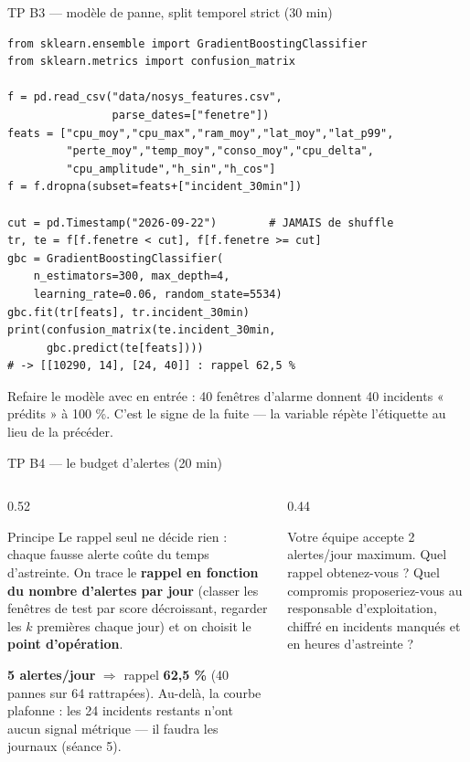 \begin{frame}[fragile]{TP B3 --- modèle de panne, split temporel strict (30 min)}
\footnotesize%
\begin{codebox}
\begin{lstlisting}
from sklearn.ensemble import GradientBoostingClassifier
from sklearn.metrics import confusion_matrix

f = pd.read_csv("data/nosys_features.csv",
                parse_dates=["fenetre"])
feats = ["cpu_moy","cpu_max","ram_moy","lat_moy","lat_p99",
         "perte_moy","temp_moy","conso_moy","cpu_delta",
         "cpu_amplitude","h_sin","h_cos"]
f = f.dropna(subset=feats+["incident_30min"])

cut = pd.Timestamp("2026-09-22")        # JAMAIS de shuffle
tr, te = f[f.fenetre < cut], f[f.fenetre >= cut]
gbc = GradientBoostingClassifier(
    n_estimators=300, max_depth=4,
    learning_rate=0.06, random_state=5534)
gbc.fit(tr[feats], tr.incident_30min)
print(confusion_matrix(te.incident_30min,
      gbc.predict(te[feats])))
# -> [[10290, 14], [24, 40]] : rappel 62,5 %
\end{lstlisting}
\end{codebox}
\begin{abox}
Refaire le modèle avec  en entrée : 40 fenêtres d'alarme
donnent 40 incidents « prédits » à 100 \%. C'est le signe de la fuite
--- la variable répète l'étiquette au lieu de la précéder.
\end{abox}
\end{frame}

\begin{frame}{TP B4 --- le budget d'alertes (20 min)}
\begin{columns}[t]
\begin{column}{0.52\textwidth}
\begin{block}{Principe}
Le rappel seul ne décide rien : chaque fausse alerte coûte du temps
d'astreinte. On trace le \textbf{rappel en fonction du nombre
d'alertes par jour} (classer les fenêtres de test par score
décroissant, regarder les $k$ premières chaque jour) et on choisit le
\textbf{point d'opération}.
\end{block}
\begin{solbox}
\textbf{5 alertes/jour} $\Rightarrow$ rappel \textbf{62,5 \%}
(40 pannes sur 64 rattrapées). Au-delà, la courbe plafonne : les
24 incidents restants n'ont aucun signal métrique --- il faudra les
journaux (séance 5).
\end{solbox}
\end{column}
\begin{column}{0.44\textwidth}
\begin{qbox}
Votre équipe accepte 2 alertes/jour maximum. Quel rappel obtenez-vous ?
Quel compromis proposeriez-vous au responsable d'exploitation, chiffré
en incidents manqués et en heures d'astreinte ?
\end{qbox}
\end{column}
\end{columns}
\end{frame}

